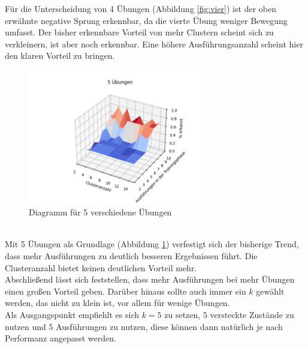 \documentclass{article}
\begin{document}
Für die Unterscheidung von 4 Übungen (Abbildung \ref{fig:vier}) ist der oben erwähnte negative Sprung erkennbar, da die vierte Übung weniger Bewegung umfasst.
Der bisher erkennbare Vorteil von mehr Clustern scheint sich zu verkleinern, ist aber noch erkennbar.
Eine höhere Ausführungsanzahl scheint hier den klaren Vorteil zu bringen.\\
\medskip
\begin{figure}[htbp]
\centering
\includegraphics[width=0.7\textwidth]{figures/5_graph.png}
\caption{Diagramm für 5 verschiedene Übungen}
\label{fig:fuenf}
\end{figure}\\
Mit 5 Übungen als Grundlage (Abbildung \ref{fig:fuenf}) verfestigt sich der bisherige Trend, dass mehr Ausführungen zu deutlich besseren Ergebnissen führt.
Die Clusteranzahl bietet keinen deutlichen Vorteil mehr.\\
Abschließend lässt sich feststellen, dass mehr Ausführungen bei mehr Übungen einen großen Vorteil geben.
Darüber hinaus sollte auch immer ein $k$ gewählt werden, das nicht zu klein ist, vor allem für wenige Übungen.\\
Als Ausgangspunkt empfiehlt es sich $k=5$ zu setzen, $5$ versteckte Zustände zu nutzen und $5$ Ausführungen zu nutzen, diese können dann natürlich je nach Performanz angepasst werden.
\end{document}
